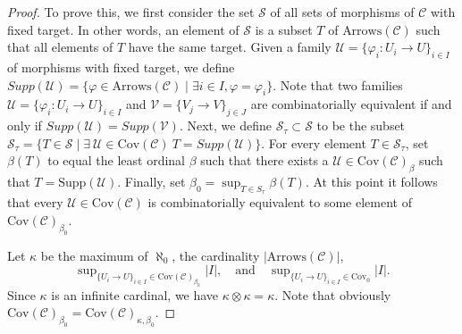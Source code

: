 \begin{proof}

To prove this, we first consider the set $\mathcal{S}$ of all
sets of morphisms of $\mathcal{C}$ with fixed target.
In other words, an element of $\mathcal{S}$ is a subset $T$
of $\text{Arrows}(\mathcal{C})$ such that all
elements of $T$ have the same target. Given a family
$\mathcal{U} = \{\varphi_i : U_i \to U\}_{i\in I}$ of morphisms with fixed
target, we define
$Supp(\mathcal{U}) = \{ \varphi \in \text{Arrows}(\mathcal{C})
\mid \exists i\in I, \varphi = \varphi_i\}$.
Note that two families $\mathcal{U} =  \{\varphi_i : U_i \to U\}_{i\in I}$
and $\mathcal{V} = \{V_j \to V\}_{j \in J}$ are combinatorially
equivalent if and only if $Supp(\mathcal{U}) = Supp(\mathcal{V})$.
Next, we define
$\mathcal{S}_\tau \subset \mathcal{S}$ to be the subset
$\mathcal{S}_\tau = \{ T \in \mathcal{S} \mid
\exists\ \mathcal{U} \in \text{Cov}(\mathcal{C}) \ T = Supp(\mathcal{U})\}$.
For every element $T \in \mathcal{S}_\tau$, set
$\beta(T)$ to equal the least ordinal $\beta$ such that
there exists a $\mathcal{U} \in \text{Cov}(\mathcal{C})_\beta$
such that $T = \text{Supp}(\mathcal{U})$. Finally, set
$\beta_0 = \sup_{T \in S_\tau} \beta(T)$.
At this point it follows that every $\mathcal{U} \in \text{Cov}(\mathcal{C})$
is combinatorially equivalent to some element
of $\text{Cov}(\mathcal{C})_{\beta_0}$.

\medskip\noindent
Let $\kappa$ be the maximum of $\aleph_0$,
the cardinality $|\text{Arrows}(\mathcal{C})|$,
$$
\sup\nolimits_{\{U_i \to U\}_{i\in I} \in \text{Cov}(\mathcal{C})_{\beta_0}}
|I|,
\quad\text{and}\quad
\sup\nolimits_{\{U_i \to U\}_{i\in I} \in \text{Cov}_0} |I|.
$$
Since $\kappa$ is an infinite cardinal, we have
$\kappa \otimes \kappa = \kappa$. Note that obviously
$\text{Cov}(\mathcal{C})_{\beta_0} =
\text{Cov}(\mathcal{C})_{\kappa, \beta_0}$.


\end{proof}
